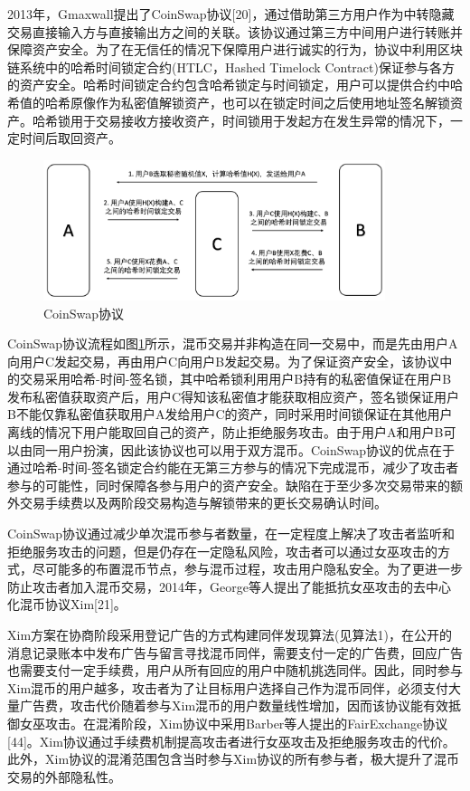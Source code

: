 2013年，Gmaxwall提出了CoinSwap协议[20]，通过借助第三方用户作为中转隐藏交易直接输入方与直接输出方之间的关联。该协议通过第三方中间用户进行转账并保障资产安全。为了在无信任的情况下保障用户进行诚实的行为，协议中利用区块链系统中的哈希时间锁定合约(HTLC，Hashed Timelock Contract)保证参与各方的资产安全。哈希时间锁定合约包含哈希锁定与时间锁定，用户可以提供合约中哈希值的哈希原像作为私密值解锁资产，也可以在锁定时间之后使用地址签名解锁资产。哈希锁用于交易接收方接收资产，时间锁用于发起方在发生异常的情况下，一定时间后取回资产。
 
\begin{figure}
\centering
\includegraphics[width=10cm]{figures/coinswap.png}
\caption{CoinSwap协议}
\label{fig:coinswap}
\end{figure}

CoinSwap协议流程如图\ref{fig:coinswap}所示，混币交易并非构造在同一交易中，而是先由用户A向用户C发起交易，再由用户C向用户B发起交易。为了保证资产安全，该协议中的交易采用哈希-时间-签名锁，其中哈希锁利用用户B持有的私密值保证在用户B发布私密值获取资产后，用户C得知该私密值才能获取相应资产，签名锁保证用户B不能仅靠私密值获取用户A发给用户C的资产，同时采用时间锁保证在其他用户离线的情况下用户能取回自己的资产，防止拒绝服务攻击。由于用户A和用户B可以由同一用户扮演，因此该协议也可以用于双方混币。CoinSwap协议的优点在于通过哈希-时间-签名锁定合约能在无第三方参与的情况下完成混币，减少了攻击者参与的可能性，同时保障各参与用户的资产安全。缺陷在于至少多次交易带来的额外交易手续费以及两阶段交易构造与解锁带来的更长交易确认时间。

CoinSwap协议通过减少单次混币参与者数量，在一定程度上解决了攻击者监听和拒绝服务攻击的问题，但是仍存在一定隐私风险，攻击者可以通过女巫攻击的方式，尽可能多的布置混币节点，参与混币过程，攻击用户隐私安全。为了更进一步防止攻击者加入混币交易，2014年，George等人提出了能抵抗女巫攻击的去中心化混币协议Xim[21]。

Xim方案在协商阶段采用登记广告的方式构建同伴发现算法(见算法1)，在公开的消息记录账本中发布广告与留言寻找混币同伴，需要支付一定的广告费，回应广告也需要支付一定手续费，用户从所有回应的用户中随机挑选同伴。因此，同时参与Xim混币的用户越多，攻击者为了让目标用户选择自己作为混币同伴，必须支付大量广告费，攻击代价随着参与Xim混币的用户数量线性增加，因而该协议能有效抵御女巫攻击。在混淆阶段，Xim协议中采用Barber等人提出的FairExchange协议[44]。Xim协议通过手续费机制提高攻击者进行女巫攻击及拒绝服务攻击的代价。此外，Xim协议的混淆范围包含当时参与Xim协议的所有参与者，极大提升了混币交易的外部隐私性。

